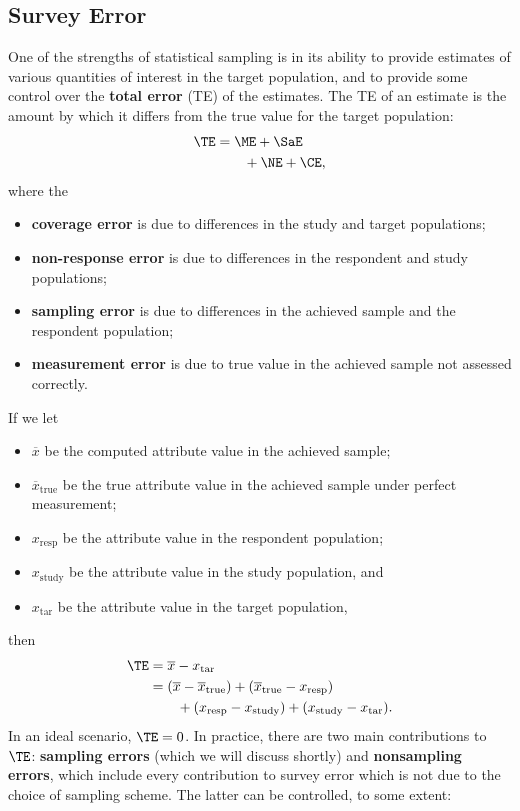 \subsection{Survey Error} 
One of the strengths of statistical sampling is in its ability to provide estimates of various quantities of interest in the target population, and to provide some control over the  \textbf{total error} (TE) of the estimates. The TE of an estimate is the amount by which it differs from the true value for the target population:
\begin{align*} 
\TE  & =  \ME  +  \SaE \\ &\qquad +  \NE +  \CE, \end{align*}
where the 
\begin{itemize}[noitemsep]
\item \textbf{coverage error} is due to differences in the study and target populations; 
\item \textbf{non-response error} is due to differences in the respondent and study populations;
\item \textbf{sampling error} is due to differences in the achieved sample and the respondent population; 
\item \textbf{measurement error} is due to true value in the achieved sample not assessed correctly.
\end{itemize}
If we let 
\begin{itemize}[noitemsep]
\item $\overline{x}$ be the computed attribute value in the achieved sample; 
\item $\overline{x}_{\mathrm{true}}$ be the true attribute value in the achieved sample under perfect measurement;
\item $x_{\mathrm{resp}}$ be the attribute value in the respondent population;
\item $x_{\mathrm{study}}$ be the attribute value in the study population, and 
\item $x_{\mathrm{tar}}$ be the attribute value in the target population,
\end{itemize}
then 
\begin{align*}\TE  &= \overline{x} - x_{\mathrm{tar}} \\ & =  (\overline{x} - \overline{x}_{\mathrm{true}}) + (\overline{x}_{\mathrm{true}}-x_{\mathrm{resp}}) \\ &\qquad + (x_{\mathrm{resp}}-x_{\mathrm{study}}) + (x_{\mathrm{study}}-x_{\mathrm{tar}}).\end{align*} In an ideal scenario, $\TE=0$. In practice, there are two main contributions to $\TE$: \textbf{sampling errors} (which we will discuss shortly) and \textbf{nonsampling errors}, which include every contribution to survey error which is not due to the choice of sampling scheme. The latter can be controlled, to some extent: 
